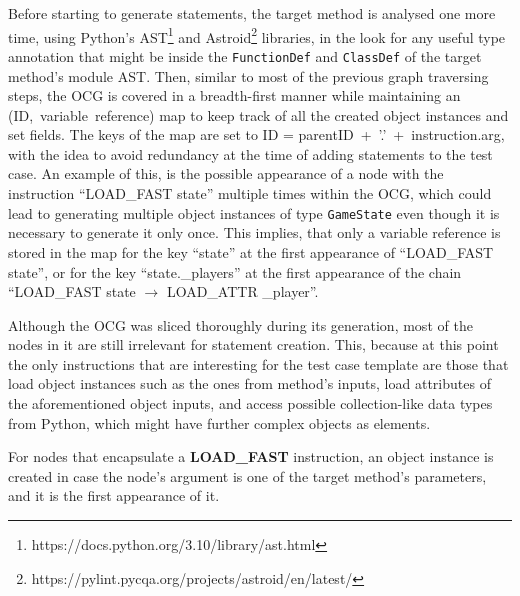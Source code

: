 \documentclass[%
  chapterprefix=false,%
  open=right,%
  twoside=true,%
  paper=a4,%
  logofile={Figures/logo.png},%
  thesistype=master,%
  UKenglish,%
]{se2thesis}
\newcommand{\classname}[1]{\texttt{#1}}
\begin{document}
Before starting to generate statements, the target method is analysed one more time, using Python's AST\footnote{https://docs.python.org/3.10/library/ast.html} and Astroid\footnote{https://pylint.pycqa.org/projects/astroid/en/latest/} libraries, in the look for any useful type annotation that might be inside the \classname{FunctionDef} and \classname{ClassDef} of the target method's module AST.\@ 
Then, similar to most of the previous graph traversing steps, the OCG is covered in a breadth-first manner while maintaining an (ID,~variable~reference) map to keep track of all the created object instances and set fields.
The keys of the map are set to ID = parentID~+~'.'~+~instruction.arg, with the idea  to avoid redundancy at the time of adding statements to the test case.
An example of this, is the possible appearance of a node with the instruction ``LOAD\_FAST state'' multiple times within the OCG, which could lead to generating multiple object instances of type \classname{GameState} even though it is necessary to generate it only once.
This implies, that only a variable reference is stored in the map for the key ``state'' at the first appearance of ``LOAD\_FAST state'', or for the key ``state.\_players'' at the first appearance of the chain ``LOAD\_FAST state \(\rightarrow\) LOAD\_ATTR \_player''.

Although the OCG was sliced thoroughly during its generation, most  of the nodes in it are still irrelevant for statement creation.
This, because at this point the only instructions that are interesting for the test case template are those that load object instances such as the ones from method's inputs, load attributes of the aforementioned object inputs, and access possible collection-like data types from Python, which might have further complex objects as elements.

For nodes that encapsulate a \textbf{LOAD\_FAST} instruction, an object instance is created in case the node's argument is one of the target method's parameters, and it is the first appearance of it.
\end{document}
